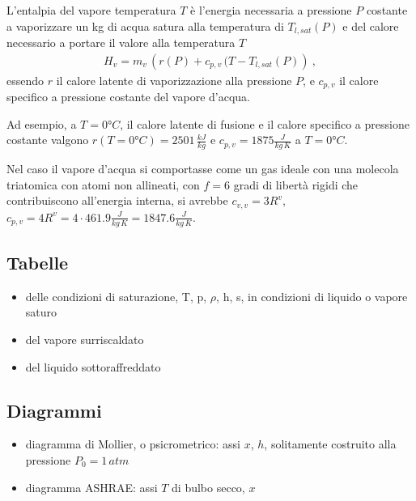 \documentclass[letterpaper,10pt,italian]{jupyterBook}
\begin{document}
\sphinxAtStartPar
L’entalpia del vapore temperatura \(T\) è l’energia necessaria a pressione \(P\) costante a vaporizzare un kg di acqua satura alla temperatura di \(T_{l,sat}(P)\) e del calore necessario a portare il valore alla temperatura \(T\)
\begin{equation*}
\begin{split}H_v = m_v \, \left( r(P) + c_{p,v} \, (T-T_{l,sat}(P) \right) \ , \end{split}
\end{equation*}
\sphinxAtStartPar
essendo \(r\) il calore latente di vaporizzazione alla pressione \(P\), e \(c_{p,v}\) il calore specifico a pressione costante del vapore d’acqua.

\sphinxAtStartPar
Ad esempio, a \(T = 0°C\), il calore latente di fusione e il calore specifico a pressione costante valgono \(r(T = 0°C) = 2501 \, \frac{kJ}{kg}\) e \(c_{p,v} = 1875 \frac{J}{kg \, K}\) a \(T = 0°C\).

\sphinxAtStartPar
{}  Nel caso il vapore d’acqua si comportasse come un gas ideale con una molecola tri\sphinxhyphen{}atomica con atomi non allineati, con \(f = 6\) gradi di libertà rigidi che contribuiscono all’energia interna, si avrebbe \(c_{v,v} = 3 R^{v}\), \(c_{p,v} = 4 R^{v} = 4 \cdot 461.9 \frac{J}{kg \, K} = 1847.6 \frac{J}{kg \, K}\).


\subsection{Tabelle}
\label{\detokenize{ch/thermodynamics/humid-air:tabelle}}\begin{itemize}
\item {} 
\sphinxAtStartPar
delle condizioni di saturazione, T, p, \(\rho\), h, s, in condizioni di liquido o vapore saturo

\item {} 
\sphinxAtStartPar
del vapore surriscaldato

\item {} 
\sphinxAtStartPar
del liquido sottoraffreddato

\end{itemize}


\subsection{Diagrammi}
\label{\detokenize{ch/thermodynamics/humid-air:diagrammi}}\begin{itemize}
\item {} 
\sphinxAtStartPar
diagramma di Mollier, o psicrometrico: assi \(x\), \(h\), solitamente costruito alla pressione \(P_0 = 1 \, atm\)

\item {} 
\sphinxAtStartPar
diagramma ASHRAE: assi \(T\) di bulbo secco, \(x\)

\end{itemize}
\end{document}
